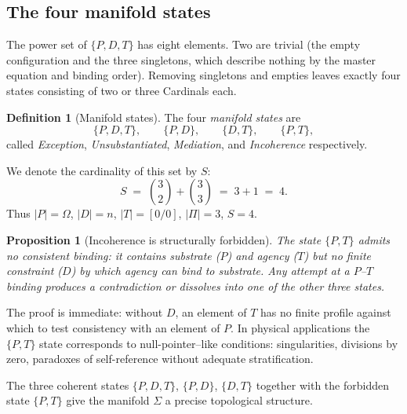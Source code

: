 \documentclass[11pt,a4paper]{article}
\newtheorem{proposition}[theorem]{Proposition}
\theoremstyle{definition}
\newtheorem{definition}[theorem]{Definition}
\theoremstyle{remark}
\begin{document}
\subsection{The four manifold states}\label{subsec:states}

The power set of $\{P,D,T\}$ has eight elements. Two are trivial (the empty configuration and the three singletons, which describe nothing by the master equation and binding order). Removing singletons and empties leaves exactly four states consisting of two or three Cardinals each.

\begin{definition}[Manifold states]\label{def:states}
The four \emph{manifold states} are
\[
\{P,D,T\},\qquad \{P,D\},\qquad \{D,T\},\qquad \{P,T\},
\]
called \emph{Exception}, \emph{Unsubstantiated}, \emph{Mediation}, and \emph{Incoherence} respectively.
\end{definition}

We denote the cardinality of this set by $S$:
\begin{equation}
S \;=\; \binom{3}{2}+\binom{3}{3} \;=\; 3+1 \;=\; 4.
\label{eq:S}
\end{equation}
Thus $|P|=\Omega$, $|D|=n$, $|T|=[0/0]$, $|\Pi|=3$, $S=4$.

\begin{proposition}[Incoherence is structurally forbidden]\label{prop:incoherence}
The state $\{P,T\}$ admits no consistent binding: it contains substrate ($P$) and agency ($T$) but no finite constraint ($D$) by which agency can bind to substrate. Any attempt at a $P$--$T$ binding produces a contradiction or dissolves into one of the other three states.
\end{proposition}

The proof is immediate: without $D$, an element of $T$ has no finite profile against which to test consistency with an element of $P$. In physical applications the $\{P,T\}$ state corresponds to null-pointer--like conditions: singularities, divisions by zero, paradoxes of self-reference without adequate stratification.

The three coherent states $\{P,D,T\}$, $\{P,D\}$, $\{D,T\}$ together with the forbidden state $\{P,T\}$ give the manifold $\Sigma$ a precise topological structure.
\end{document}
